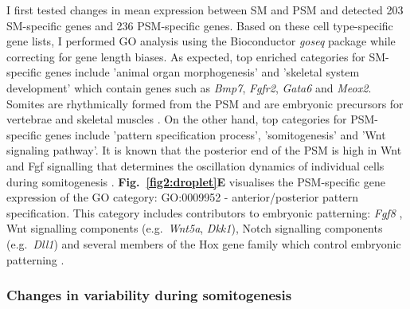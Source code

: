 I first tested changes in mean expression between SM and PSM and detected 203 SM-specific genes and 236 PSM-specific genes. 
Based on these cell type-specific gene lists, I performed GO analysis using the Bioconductor \emph{goseq} package while correcting for gene length biases. 
As expected, top enriched categories for SM-specific genes include 'animal organ morphogenesis' and 'skeletal system development' which contain genes such as \textit{Bmp7}, \textit{Fgfr2}, \textit{Gata6} and \textit{Meox2}. 
Somites are rhythmically formed from the PSM and are embryonic precursors for vertebrae and skeletal muscles \citep{Dequeant2008}. 
On the other hand, top categories for PSM-specific genes include 'pattern specification process', 'somitogenesis' and 'Wnt signaling pathway'. 
It is known that the posterior end of the PSM is high in Wnt and Fgf signalling that determines the oscillation dynamics of individual cells during somitogenesis \citep{Oates2012}. 
\textbf{Fig.~\ref{fig2:droplet}E} visualises the PSM-specific gene expression of the GO category: GO:0009952 - anterior/posterior pattern specification. 
This category includes contributors to embryonic patterning: \textit{Fgf8} \citep{Dubrulle2004}, Wnt signalling components (e.g.~\textit{Wnt5a}, \textit{Dkk1}), Notch signalling components (e.g.~\textit{Dll1}) \citep{Dequeant2008} and several members of the Hox gene family which control embryonic patterning \citep{Pearson2005}.

\newpage

\subsubsection{Changes in variability during somitogenesis}

